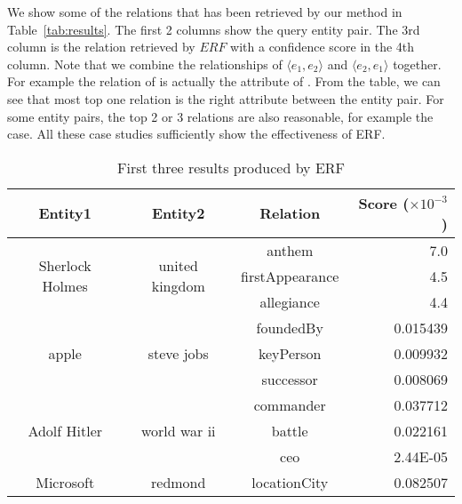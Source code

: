 We show some of the relations that has been retrieved by our method in Table~\ref{tab:results}.
The first 2 columns show the query entity pair.
The 3rd column is the relation retrieved by $ERF$ with a confidence score in the 4th column.
Note that we combine the relationships of $\langle e_1,e_2\rangle$ and $\langle e_2,e_1\rangle$ together.
For example the relation  of  is actually the attribute of . From the table, we can see that most top one relation is the right attribute between the entity pair.
For some entity pairs, the top 2 or 3 relations are also reasonable, for example the  case.
All these case studies sufficiently show the effectiveness of ERF.
\begin{table}[ht!]
\vspace{-6mm}
  \centering
  \caption{First three results produced by ERF}
  \small
    \begin{tabular}{cccr}
    \toprule
    Entity1 & Entity2 & Relation & Score ($\times10^{-3}$) \\
    \midrule
    \multicolumn{1}{c}{\multirow{3}{*}{\parbox{1cm}{ Sherlock Holmes}}} & \multicolumn{1}{c}{\multirow{3}[0]{*}{united kingdom}} & anthem & 7.0 \\
    \multicolumn{1}{c}{} & \multicolumn{1}{c}{} & firstAppearance & 4.5 \\
    \multicolumn{1}{c}{} & \multicolumn{1}{c}{} & allegiance & 4.4 \\
    \hline
    \multicolumn{1}{c}{\multirow{3}{*}{\parbox{1cm}{\centering apple}}} & \multicolumn{1}{c}{\multirow{3}[0]{*}{steve jobs}} & foundedBy & 0.015439 \\
    \multicolumn{1}{c}{} & \multicolumn{1}{c}{} & keyPerson & 0.009932 \\
    \multicolumn{1}{c}{} & \multicolumn{1}{c}{} & successor & 0.008069 \\
    \hline
    \multicolumn{1}{c}{\multirow{3}{*}{\parbox{1cm}{\centering Adolf Hitler}}} & \multicolumn{1}{c}{\multirow{3}[0]{*}{world war ii}} & commander & 0.037712 \\
    \multicolumn{1}{c}{} & \multicolumn{1}{c}{} & battle & 0.022161 \\
    \multicolumn{1}{c}{} & \multicolumn{1}{c}{} & ceo   & 2.44E-05 \\
    \hline
    \multicolumn{1}{c}{\multirow{3}{*}{\parbox{1cm}{\centering Microsoft}}} & \multicolumn{1}{c}{\multirow{3}[0]{*}{redmond}} & locationCity & 0.082507 \\

\end{tabular}
\end{table}
